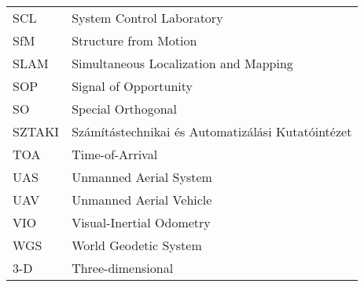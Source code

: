 \begin{longtable}{l l}
    SCL & System Control Laboratory \\
    SfM & Structure from Motion \\
    SLAM & Simultaneous Localization and Mapping \\
    SOP & Signal of Opportunity \\
    SO & Special Orthogonal \\
    SZTAKI & Számítástechnikai és Automatizálási Kutatóintézet \\
    TOA & Time-of-Arrival \\
    UAS & Unmanned Aerial System \\
    UAV & Unmanned Aerial Vehicle \\
    VIO & Visual-Inertial Odometry \\
    WGS & World Geodetic System \\
    3-D & Three-dimensional
\end{longtable}